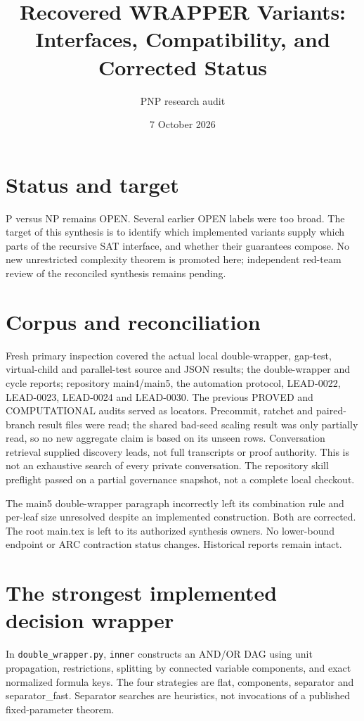 \documentclass[11pt]{article}
\title{Recovered WRAPPER Variants: Interfaces, Compatibility, and Corrected Status}
\author{PNP research audit}
\date{7 October 2026}
\begin{document}
\maketitle
\section*{Status and target}
P versus NP remains OPEN. Several earlier OPEN labels were too broad. The target
of this synthesis is to identify which implemented variants supply which parts
of the recursive SAT interface, and whether their guarantees compose. No new
unrestricted complexity theorem is promoted here; independent red-team review
of the reconciled synthesis remains pending.

\section*{Corpus and reconciliation}
Fresh primary inspection covered the actual local double-wrapper, gap-test,
virtual-child and parallel-test source and JSON results; the double-wrapper and
cycle reports; repository main4/main5, the automation protocol, LEAD-0022,
LEAD-0023, LEAD-0024 and LEAD-0030. The previous PROVED and COMPUTATIONAL audits
served as locators. Precommit, ratchet and paired-branch result files were read;
the shared bad-seed scaling result was only partially read, so no new aggregate
claim is based on its unseen rows. Conversation retrieval supplied discovery
leads, not full transcripts or proof authority. This is not an exhaustive search
of every private conversation. The repository skill preflight passed on a
partial governance snapshot, not a complete local checkout.

The main5 double-wrapper paragraph incorrectly left its combination rule and
per-leaf size unresolved despite an implemented construction. Both are corrected.
The root main.tex is left to its authorized synthesis owners. No lower-bound
endpoint or ARC contraction status changes. Historical reports remain intact.

\section*{The strongest implemented decision wrapper}
In \texttt{double\_wrapper.py}, \texttt{inner} constructs an AND/OR DAG using
unit propagation, restrictions, splitting by connected variable components,
and exact normalized formula keys. The four strategies are flat, components,
separator and separator\_fast. Separator searches are heuristics, not invocations
of a published fixed-parameter theorem.
\end{document}
